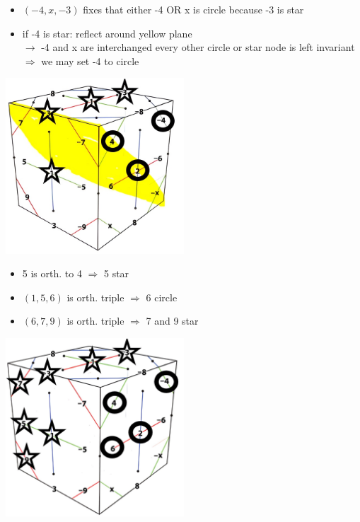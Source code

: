 \documentclass{beamer}
\begin{document}
\begin{frame}
\begin{itemize}
\item $(-4,x,-3)$ fixes that either -4 OR x is circle because -3 is star
\item if -4 is star: reflect around yellow plane \\ $\rightarrow$ -4 and x are interchanged every other circle or star node is left invariant\\
$\Rightarrow$ we may set -4 to circle
\end{itemize}
\begin{center}
\includegraphics[width=0.5\textwidth]{KSProof04.jpg}
\end{center}
\end{frame}

\begin{frame}
\begin{itemize}
\item 5 is orth. to 4 $\Rightarrow$ 5 star
\item $(1,5,6)$ is orth. triple $\Rightarrow$ 6 circle
\item $(6,7,9)$ is orth. triple $\Rightarrow$ 7 and 9 star
\end{itemize}
\begin{center}
\includegraphics[width=0.5\textwidth]{KSProof05.jpg}
\end{center}
\end{frame}
\end{document}
